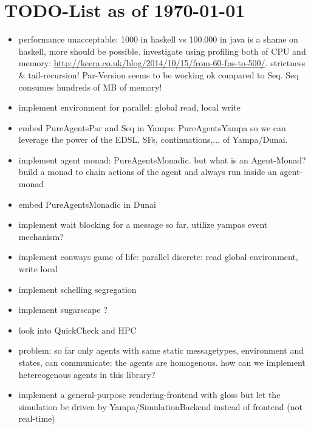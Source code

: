 \section{TODO-List as of \today}

\begin{itemize}
\item performance unacceptable: 1000 in haskell vs 100.000 in java is a shame on haskell, more should be possible. investigate using profiling both of CPU and memory: \url{http://keera.co.uk/blog/2014/10/15/from-60-fps-to-500/}. strictness \& tail-recursion!
	Par-Version seems to be working ok compared to Seq. Seq consumes hundreds of MB of memory!


\item implement environment for parallel: global read, local write

\item embed PureAgentsPar and Seq in Yampa: PureAgentsYampa so we can leverage the power of the EDSL, SFs, continuations,... of Yampa/Dunai.
\item implement agent monad: PureAgentsMonadic. but what is an Agent-Monad? build a monad to chain actions of the agent and always run inside an agent-monad
\item embed PureAgentsMonadic in Dunai

\item implement wait blocking for a message so far. utilize yampas event mechanism?

\item implement conways game of life: parallel discrete: read global environment, write local
\item implement schelling segregation
\item implement sugarscape ?


\item look into QuickCheck and HPC
\item problem: so far only agents with same static messagetypes, environment and states, can communicate: the agents are homogenous. how can we implement hetereogenous agents in this library?
\item implement a general-purpose rendering-frontend with gloss but let the simulation be driven by Yampa/SimulationBackend instead of frontend (not real-time)



\end{itemize}
